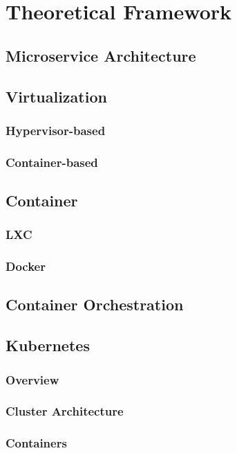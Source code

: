 
\chapter{Theoretical Framework}
\label{chp:theoretical-framework}

\section{Microservice Architecture}

\section{Virtualization}
\subsection{Hypervisor-based}
\subsection{Container-based}

\section{Container}
\subsection{LXC}
\subsection{Docker}

\section{Container Orchestration}

\section{Kubernetes}
\subsection{Overview}
\subsection{Cluster Architecture}
\subsection{Containers}
